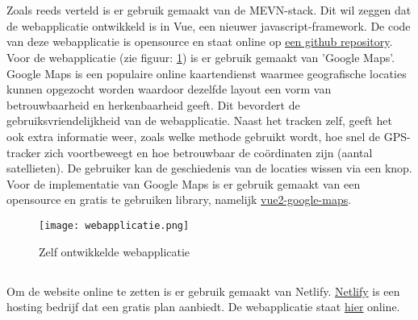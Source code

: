 \section{}
\label{ch:frontend}

\subsection{}
Zoals reeds verteld is er gebruik gemaakt van de MEVN-stack. Dit wil zeggen dat de webapplicatie ontwikkeld is in Vue, een nieuwer javascript-framework. De code van deze webapplicatie is opensource en staat online op \underline{\href{https://github.com/IndyVC/bap-frontend}{een github repository}}.
\newline
Voor de webapplicatie (zie figuur: \ref{fig:webapplicatie}) is er gebruik gemaakt van 'Google Maps'. Google Maps is een populaire online kaartendienst waarmee geografische locaties kunnen opgezocht worden waardoor dezelfde layout een vorm van betrouwbaarheid en herkenbaarheid geeft. Dit bevordert de gebruiksvriendelijkheid van de webapplicatie. Naast het tracken zelf, geeft het ook extra informatie weer, zoals welke methode gebruikt wordt, hoe snel de GPS-tracker zich voortbeweegt en hoe betrouwbaar de coördinaten zijn (aantal satellieten). De gebruiker kan de geschiedenis van de locaties wissen via een knop.
\newline
Voor de implementatie van Google Maps is er gebruik gemaakt van een opensource en gratis te gebruiken library, namelijk \href{https://www.npmjs.com/package/vue2-google-maps}{vue2-google-maps}.
\begin{figure}
	\texttt{[image: webapplicatie.png]}
	\caption{Zelf ontwikkelde webapplicatie}
	\label{fig:webapplicatie}
\end{figure}

\subsection{}
Om de website online te zetten is er gebruik gemaakt van Netlify. \href{https://www.netlify.com/}{Netlify} is een hosting bedrijf dat een gratis plan aanbiedt. De webapplicatie staat \href{https://indy-bap-frontend.netlify.com/}{\underline{hier}} online.

